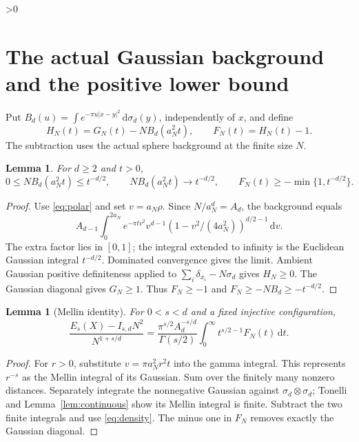 \documentclass[11pt,a4paper]{article}
\newtheorem{lemma}[theorem]{Lemma}
\theoremstyle{definition}
\newcommand{\dd}{\,\mathrm d}
\newcommand{\abs}[1]{\lvert#1\rvert}
\numberwithin{equation}{section}
\let\originalsection\section
\renewcommand{\section}{\ifnum\value{section}>0\clearpage\fi\originalsection}
\begin{document}
\section{The actual Gaussian background and the positive lower bound}\label{sec:lower}
Put $B_d(u)=\int e^{-\pi u\abs{x-y}^2}\dd\sigma_d(y)$, independently of $x$, and define
\begin{equation}\label{eq:HF}
 H_N(t)=G_N(t)-NB_d(a_N^2t),\qquad F_N(t)=H_N(t)-1.
\end{equation}
The subtraction uses the actual sphere background at the finite size $N$.

\begin{lemma}\label{lem:background}
For $d\ge2$ and $t>0$,
\begin{equation}\label{eq:background}
 0\le NB_d(a_N^2t)\le t^{-d/2},\qquad
 NB_d(a_N^2t)\longrightarrow t^{-d/2},\qquad
 F_N(t)\ge-\min\{1,t^{-d/2}\}.
\end{equation}
\end{lemma}
\begin{proof}
Use \eqref{eq:polar} and set $v=a_N\rho$. Since $N/a_N^d=A_d$, the background equals
\begin{equation}
 A_{d-1}\int_0^{2a_N}e^{-\pi t v^2}v^{d-1}
       (1-v^2/(4a_N^2))^{d/2-1}\dd v.
\end{equation}
The extra factor lies in $[0,1]$; the integral extended to infinity is the Euclidean Gaussian integral $t^{-d/2}$. Dominated convergence gives the limit. Ambient Gaussian positive definiteness applied to $\sum_i\delta_{x_i}-N\sigma_d$ gives $H_N\ge0$. The Gaussian diagonal gives $G_N\ge1$. Thus $F_N\ge-1$ and $F_N\ge-NB_d\ge-t^{-d/2}$.
\end{proof}

\begin{lemma}[Mellin identity]\label{lem:mellin}
For $0<s<d$ and a fixed injective configuration,
\begin{equation}\label{eq:mellinpos}
 \frac{E_s(X)-I_{s,d}N^2}{N^{1+s/d}}=
 \frac{\pi^{s/2}A_d^{-s/d}}{\Gamma(s/2)}
           \int_0^\infty t^{s/2-1}F_N(t)\dd t.
\end{equation}
\end{lemma}
\begin{proof}
For $r>0$, substitute $v=\pi a_N^2r^2t$ into the gamma integral. This represents $r^{-s}$ as the Mellin integral of its Gaussian. Sum over the finitely many nonzero distances. Separately integrate the nonnegative Gaussian against $\sigma_d\otimes\sigma_d$; Tonelli and Lemma~\ref{lem:continuous} show its Mellin integral is finite. Subtract the two finite integrals and use \eqref{eq:density}. The minus one in $F_N$ removes exactly the Gaussian diagonal.
\end{proof}
\end{document}
